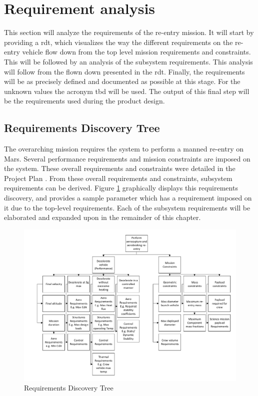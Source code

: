 \section{Requirement analysis} \label{ch:req}
This section will analyze the requirements of the re-entry mission. It will start by providing a \acrfull{rdt}, which visualizes the way the different requirements on the re-entry vehicle flow down from the top level mission requirements and constraints. This will be followed by an analysis of the subsystem requirements. This analysis will follow from the flown down presented in the \gls{rdt}. Finally, the requirements will be as precisely defined and documented as possible at this stage. For the unknown values the acronym \gls{tbd} will be used. The output of this final step will be the requirements used during the product design. %

\subsection{Requirements Discovery Tree}
The overarching mission requires the system to perform a manned re-entry on Mars. Several performance requirements and mission constraints are imposed on the system. These overall requirements and constraints were detailed in the Project Plan \cite{Balasooriyan2015}. From these overall requirements and constraints, subsystem requirements can be derived. Figure \ref{fig:RBS} graphically displays this requirements discovery, and provides a sample parameter which has a requirement imposed on it due to the top-level requirements. Each of the subsystem requirements will be elaborated and expanded upon in the remainder of this chapter.


\vspace{-7mm}
\begin{figure}[H]
\centering
\includegraphics[width=1.00\textwidth]{Figure/RBS.pdf}
\vspace{-7mm}
\caption{Requirements Discovery Tree} 
\label{fig:RBS}
\end{figure}

